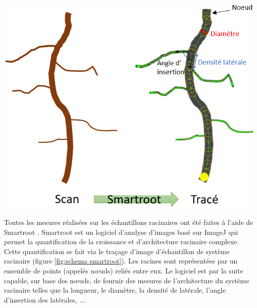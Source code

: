 \begin{minipage}{0.5\linewidth}
\captionsetup{type=figure,hypcap=true}
\centering
\includegraphics[width=1\linewidth]{Image/schema smartroot.png}
\label{fig:schema smartroot}
\end{minipage}\hfill
\begin{minipage}{0.45\linewidth}
Toutes les mesures réalisées sur les échantillons racinaires ont été faites à l'aide de Smartroot \citep{lobet_novel_2011}.
Smartroot est un logiciel d'analyse d'images basé sur ImageJ qui permet la quantification de la croissance et d'architecture racinaire complexe.
Cette quantification se fait via le traçage d'image d'échantillon de système racinaire (figure \ref{fig:schema smartroot}).
Les racines sont représentées par un ensemble de points (appelés nœuds) reliés entre eux.
Le logiciel est par la suite capable, sur base des nœuds, de fournir des mesures de l'architecture du système racinaire telles que la longueur, le diamètre, la densité de latérale, l'angle d'insertion des latérales, ...
\end{minipage} 
\newline


